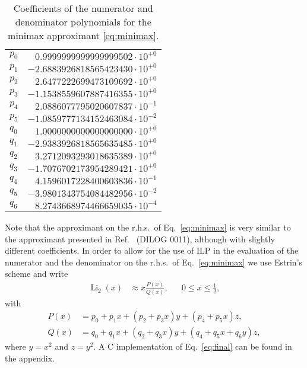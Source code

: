 \documentclass[10pt,DIV=16,twocolumn,numbers=noenddot]{scrartcl}
\newcommand{\Li}{\operatorname{Li}_2}
\begin{document}
\begin{table}[t]
  \centering
  \caption{Coefficients of the numerator and denominator polynomials
    for the minimax approximant \eqref{eq:minimax}.}
  \begin{tabular}{lr}
    \toprule
    $p_0$ & $ 0.9999999999999999502\cdot 10^{+0}$ \\
    $p_1$ & $-2.6883926818565423430\cdot 10^{+0}$ \\
    $p_2$ & $ 2.6477222699473109692\cdot 10^{+0}$ \\
    $p_3$ & $-1.1538559607887416355\cdot 10^{+0}$ \\
    $p_4$ & $ 2.0886077795020607837\cdot 10^{-1}$ \\
    $p_5$ & $-1.0859777134152463084\cdot 10^{-2}$ \\
    $q_0$ & $ 1.0000000000000000000\cdot 10^{+0}$ \\
    $q_1$ & $-2.9383926818565635485\cdot 10^{+0}$ \\
    $q_2$ & $ 3.2712093293018635389\cdot 10^{+0}$ \\
    $q_3$ & $-1.7076702173954289421\cdot 10^{+0}$ \\
    $q_4$ & $ 4.1596017228400603836\cdot 10^{-1}$ \\
    $q_5$ & $-3.9801343754084482956\cdot 10^{-2}$ \\
    $q_6$ & $ 8.2743668974466659035\cdot 10^{-4}$ \\
    \bottomrule
  \end{tabular}
  \label{tab:coeffs}
\end{table}
%
Note that the approximant on the r.h.s.\ of Eq.~\eqref{eq:minimax} is
very similar to the approximant presented in Ref.~\cite{morris} (DILOG
0011), although with slightly different coefficients.  In order to
allow for the use of ILP in the evaluation of the numerator and the
denominator on the r.h.s.\ of Eq.~\eqref{eq:minimax} we use Estrin's
scheme and write
%
\begin{align}
  \Li(x) &\approx x\frac{P(x)}{Q(x)}, & &0\leq x \leq \frac{1}{2},
  \label{eq:final}
\end{align}
%
with
%
\begin{align}
  P(x) &= p_0 + p_1 x + (p_2 + p_3 x) y + (p_4 + p_5 x) z, \\
  Q(x) &= q_0 + q_1 x + (q_2 + q_3 x) y + (q_4 + q_5 x + q_6 y) z,
\end{align}
%
where $y=x^2$ and $z=y^2$.  A C implementation of Eq.~\eqref{eq:final}
can be found in the appendix.
\end{document}
